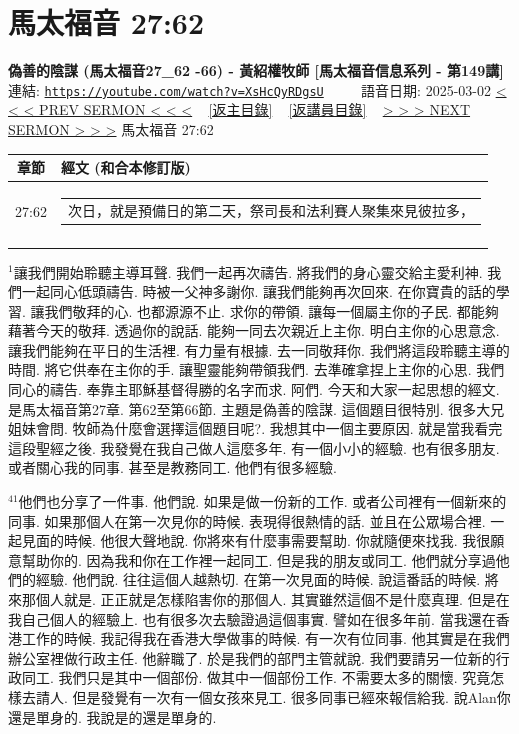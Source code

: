 \documentclass{book}
\begin{document}
\section{馬太福音 27:62}
\label{sec:XsHcQyRDgsU}
\textbf{偽善的陰謀 (馬太福音27\_62 -66) - 黃紹權牧師  [馬太福音信息系列 - 第149講]}
\newline
\newline
連結: \href{https://youtube.com/watch?v=XsHcQyRDgsU}{\texttt{https://youtube.com/watch?v=XsHcQyRDgsU}} ~~~~ 語音日期: 2025-03-02
\newline
\newline
\hyperref[sec:MfR5_HAo14I]{< < < PREV SERMON < < <}
~
\hyperlink{toc}{[返主目錄]}
~
\hyperref[ch:preacher16]{[返講員目錄]}
~
\hyperref[sec:FPn17JgDaFk]{> > > NEXT SERMON > > >}
\newline
\newline
馬太福音 27:62
\newline
\begin{longtable}{cl}
\hline
\hline
章節 & 經文 (和合本修訂版)\\
\hline
27:62 & \begin{tabularx}{0.7\textwidth}{X} 次日，就是預備日的第二天，祭司長和法利賽人聚集來見彼拉多， \end{tabularx} \\ \\
[1ex]
\hline
\hline
\end{longtable}
$^{1}$讓我們開始聆聽主導耳聲.
我們一起再次禱告.
將我們的身心靈交給主愛利神.
我們一起同心低頭禱告.
時被一父神多謝你.
讓我們能夠再次回來.
在你寶貴的話的學習.
讓我們敬拜的心.
也都源源不止.
求你的帶領.
讓每一個屬主你的子民.
都能夠藉著今天的敬拜.
透過你的說話.
能夠一同去次親近上主你.
明白主你的心思意念.
讓我們能夠在平日的生活裡.
有力量有根據.
去一同敬拜你.
我們將這段聆聽主導的時間.
將它供奉在主你的手.
讓聖靈能夠帶領我們.
去準確拿捏上主你的心思.
我們同心的禱告.
奉靠主耶穌基督得勝的名字而求.
阿們.
今天和大家一起思想的經文.
是馬太福音第27章.
第62至第66節.
主題是偽善的陰謀.
這個題目很特別.
很多大兄姐妹會問.
牧師為什麼會選擇這個題目呢?.
我想其中一個主要原因.
就是當我看完這段聖經之後.
我發覺在我自己做人這麼多年.
有一個小小的經驗.
也有很多朋友.
或者關心我的同事.
甚至是教務同工.
他們有很多經驗.

$^{41}$他們也分享了一件事.
他們說.
如果是做一份新的工作.
或者公司裡有一個新來的同事.
如果那個人在第一次見你的時候.
表現得很熱情的話.
並且在公眾場合裡.
一起見面的時候.
他很大聲地說.
你將來有什麼事需要幫助.
你就隨便來找我.
我很願意幫助你的.
因為我和你在工作裡一起同工.
但是我的朋友或同工.
他們就分享過他們的經驗.
他們說.
往往這個人越熱切.
在第一次見面的時候.
說這番話的時候.
將來那個人就是.
正正就是怎樣陷害你的那個人.
其實雖然這個不是什麼真理.
但是在我自己個人的經驗上.
也有很多次去驗證過這個事實.
譬如在很多年前.
當我還在香港工作的時候.
我記得我在香港大學做事的時候.
有一次有位同事.
他其實是在我們辦公室裡做行政主任.
他辭職了.
於是我們的部門主管就說.
我們要請另一位新的行政同工.
我們只是其中一個部份.
做其中一個部份工作.
不需要太多的關懷.
究竟怎樣去請人.
但是發覺有一次有一個女孩來見工.
很多同事已經來報信給我.
說Alan你還是單身的.
我說是的還是單身的.
\end{document}
